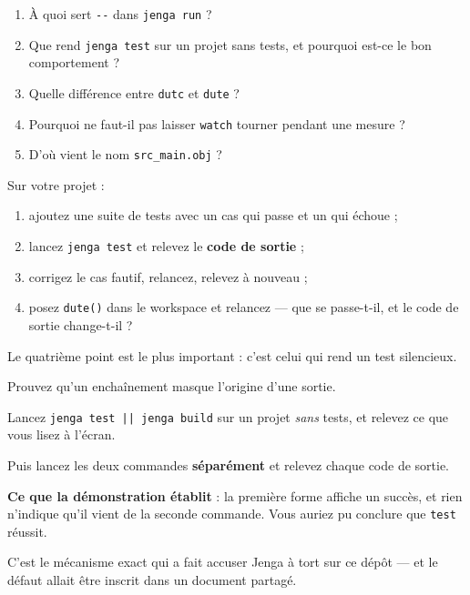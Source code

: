 \begin{nkquestions}
\begin{enumerate}
\item À quoi sert \texttt{-{}-} dans \texttt{jenga run} ?
\item Que rend \texttt{jenga test} sur un projet sans tests, et pourquoi est-ce
      le bon comportement ?
\item Quelle différence entre \texttt{dutc} et \texttt{dute} ?
\item Pourquoi ne faut-il pas laisser \texttt{watch} tourner pendant une mesure ?
\item D'où vient le nom \texttt{src\_main.obj} ?
\end{enumerate}
\end{nkquestions}

\begin{nkpratique}
Sur votre projet :

\begin{enumerate}
\item ajoutez une suite de tests avec un cas qui passe et un qui échoue ;
\item lancez \texttt{jenga test} et relevez le \textbf{code de sortie} ;
\item corrigez le cas fautif, relancez, relevez à nouveau ;
\item posez \texttt{dute()} dans le workspace et relancez --- que se passe-t-il,
      et le code de sortie change-t-il ?
\end{enumerate}

Le quatrième point est le plus important : c'est celui qui rend un test
silencieux.
\end{nkpratique}

\begin{nkdemo}
Prouvez qu'un enchaînement masque l'origine d'une sortie.

Lancez \texttt{jenga test || jenga build} sur un projet \emph{sans} tests, et
relevez ce que vous lisez à l'écran.

Puis lancez les deux commandes \textbf{séparément} et relevez chaque code de
sortie.

\textbf{Ce que la démonstration établit} : la première forme affiche un succès,
et rien n'indique qu'il vient de la seconde commande. Vous auriez pu conclure que
\texttt{test} réussit.

C'est le mécanisme exact qui a fait accuser Jenga à tort sur ce dépôt --- et le
défaut allait être inscrit dans un document partagé.
\end{nkdemo}

